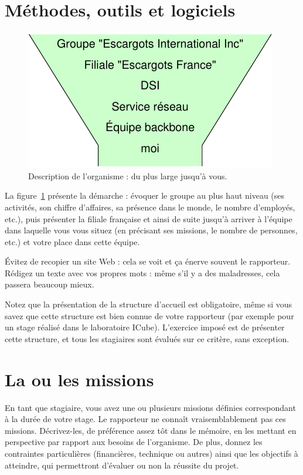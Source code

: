\documentclass [twoside,openright,a4paper,11pt,french] {report}
\begin{document}
\section{Méthodes, outils et logiciels}

\begin {figure} [htbp]
    \begin {center}
	\includegraphics [width=.35\textwidth] {entonnoir.pdf}
    \end {center}
    \label {fig:entonnoir}
    \caption {Description de l'organisme : du plus large jusqu'à vous.}
\end {figure}

La figure~\ref {fig:entonnoir} présente la démarche : évoquer le
groupe au plus haut niveau (ses activités, son chiffre d'affaires, sa
présence dans le monde, le nombre d'employés, etc.), puis présenter
la filiale française et ainsi de suite jusqu'à arriver à l'équipe
dans laquelle vous vous situez (en précisant ses missions, le nombre
de personnes, etc.) et votre place dans cette équipe.

Évitez de recopier un site Web : cela se voit et ça énerve souvent
le rapporteur. Rédigez un texte avec vos propres mots : même s'il y a
des maladresses, cela passera beaucoup mieux.

Notez que la présentation de la structure d'accueil est obligatoire,
même si vous savez que cette structure est bien connue de votre
rapporteur (par exemple pour un stage réalisé dans le laboratoire
ICube). L'exercice imposé est de présenter cette structure, et tous
les stagiaires sont évalués sur ce critère, sans exception.

\section {La ou les missions}
    \label {sec:mission}

En tant que stagiaire, vous avez une ou plusieurs missions définies
correspondant à la durée de votre stage. Le rapporteur ne connaît
vraisemblablement pas ces missions. Décrivez-les, de préférence assez
tôt dans le mémoire, en les mettant en perspective par rapport aux
besoins de l'organisme. De plus, donnez les contraintes particulières
(financières, technique ou autres) ainsi que les objectifs à atteindre,
qui permettront d'évaluer ou non la réussite du projet.
\end{document}
